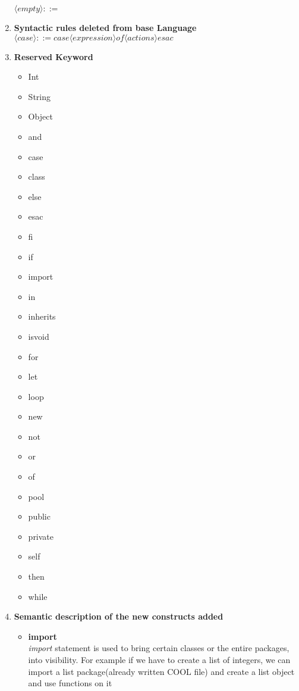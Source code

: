 \documentclass[11pt]{article}
\begin{document}
\begin{enumerate}
$\langle empty\rangle                   ::=  $\\

    
    
    \item \textbf{Syntactic rules deleted from base Language}\\
    $\langle case\rangle                    ::= case \langle expression\rangle of \langle actions\rangle esac$\\
    \item \textbf{Reserved Keyword} 
    \begin{itemize}
        \item Int
        \item String
        \item Object
        \item and
        \item case
        \item class
        \item else
        \item esac
        \item fi
        \item if 
        \item import
        \item in
        \item inherits
        \item isvoid
        \item for
        \item let
        \item loop
        \item new
        \item not
        \item or
        \item of
        \item pool
        \item public
        \item private
        \item self
        \item then
        \item while

    \end{itemize}
    \item \textbf{Semantic description of the new constructs added}
    \begin{itemize}
        \item \textbf{import}\\
        \textit{import} statement is used to bring certain classes or the entire packages, into visibility. For example if we have to create a list of integers, we can import a list package(already written COOL file) and create a list object and use functions on it


\end{itemize}
\end{enumerate}
\end{document}
